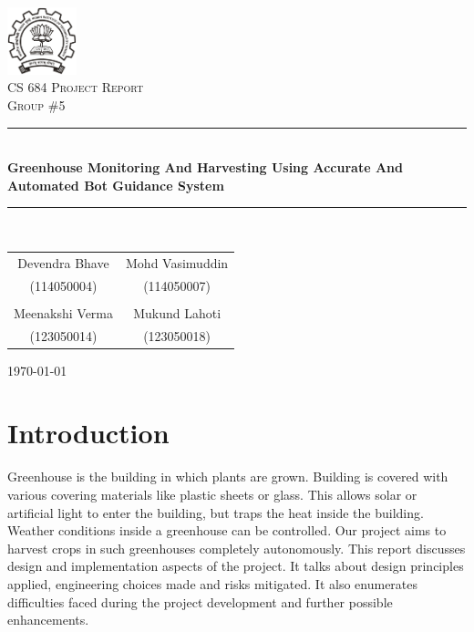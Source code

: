\documentclass[a4paper, 12pt]{article}
\begin{document}
\begin{titlepage}
 \centering
 \includegraphics[width=0.15\textwidth]{./iitblogo}\\[1.5cm]
 \textsc{\LARGE CS 684 Project Report}\\[1.5cm]
 \textsc{\Large Group \#5} \\ [1.5cm]
 \rule{\linewidth}{0.5mm} \\ [0.5cm]
 {\LARGE \textbf{Greenhouse Monitoring And Harvesting Using Accurate And Automated Bot Guidance System}}
 \rule{\linewidth}{0.5mm}
 \\ [1.5cm]

 \large
 \begin{tabular}{cc}
  Devendra Bhave & Mohd Vasimuddin\\
  (114050004) & (114050007)\\
  \\
  Meenakshi Verma & Mukund Lahoti\\
  (123050014) & (123050018)
 \end{tabular}

 \vspace{2cm}
 \today
\end{titlepage}

\tableofcontents
\thispagestyle{empty}
\cleardoublepage

\newpage
\listoffigures
\listoftables
\thispagestyle{empty}
\cleardoublepage

\setcounter{page}{1}
\section{Introduction}
Greenhouse is the building in which plants are grown. Building is covered with various covering materials like
plastic sheets or glass. This allows solar or artificial light to enter the building, but traps the heat inside
the building. Weather conditions inside a greenhouse can be controlled. Our project aims to
harvest crops in such greenhouses completely autonomously. This report discusses design and implementation aspects of
the project. It talks about design principles applied, engineering choices made and risks mitigated. It also 
enumerates difficulties faced during the project development and further possible enhancements.
\end{document}
